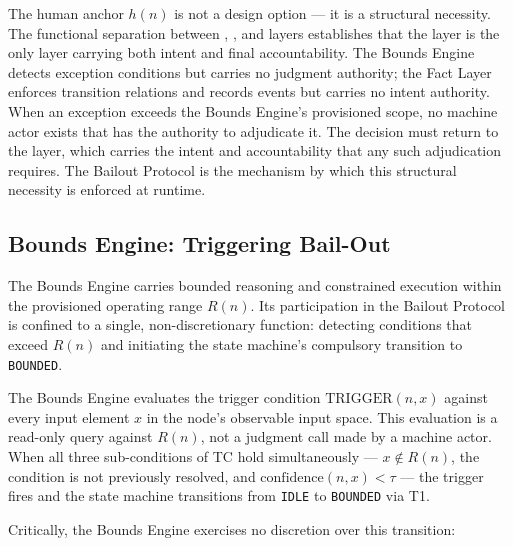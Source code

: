 The human anchor $h(n)$ is not a design option --- it is a structural necessity. The functional separation between \purpose{}, \bounds{}, and \fact{} layers establishes that the \purpose{} layer is the only layer carrying both intent and final accountability. The Bounds Engine detects exception conditions but carries no judgment authority; the Fact Layer enforces transition relations and records events but carries no intent authority. When an exception exceeds the Bounds Engine's provisioned scope, no machine actor exists that has the authority to adjudicate it. The decision must return to the \purpose{} layer, which carries the intent and accountability that any such adjudication requires. The Bailout Protocol is the mechanism by which this structural necessity is enforced at runtime.

\subsection{Bounds Engine: Triggering Bail-Out}
\label{sec:bounds-engine-trigger}

The Bounds Engine carries bounded reasoning and constrained execution within the provisioned operating range $R(n)$. Its participation in the Bailout Protocol is confined to a single, non-discretionary function: detecting conditions that exceed $R(n)$ and initiating the state machine's compulsory transition to \texttt{BOUNDED}.

The Bounds Engine evaluates the trigger condition $\text{TRIGGER}(n, x)$ against every input element $x$ in the node's observable input space. This evaluation is a read-only query against $R(n)$, not a judgment call made by a machine actor. When all three sub-conditions of TC hold simultaneously --- $x \notin R(n)$, the condition is not previously resolved, and $\text{confidence}(n, x) < \tau$ --- the trigger fires and the state machine transitions from \texttt{IDLE} to \texttt{BOUNDED} via T1.

Critically, the Bounds Engine exercises no discretion over this transition:

